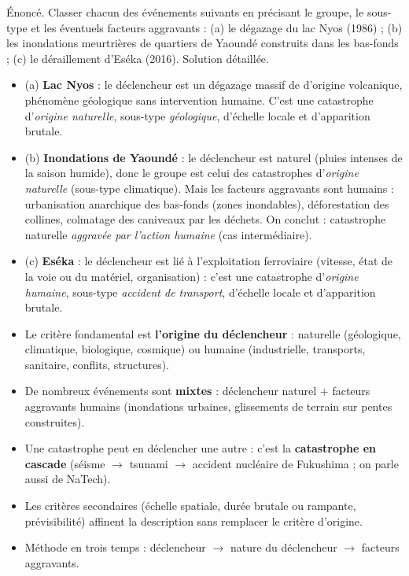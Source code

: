 \documentclass[11pt]{article}
\begin{document}
\begin{exoresolu}
Énoncé. Classer chacun des événements suivants en précisant le groupe, le sous-type et les éventuels facteurs aggravants : (a) le dégazage du lac Nyos (1986) ; (b) les inondations meurtrières de quartiers de Yaoundé construits dans les bas-fonds ; (c) le déraillement d'Eséka (2016).
\tcblower
Solution détaillée.
\begin{itemize}
\item (a) \textbf{Lac Nyos} : le déclencheur est un dégazage massif de  d'origine volcanique, phénomène géologique sans intervention humaine. C'est une catastrophe d'\emph{origine naturelle}, sous-type \emph{géologique}, d'échelle locale et d'apparition brutale.
\item (b) \textbf{Inondations de Yaoundé} : le déclencheur est naturel (pluies intenses de la saison humide), donc le groupe est celui des catastrophes d'\emph{origine naturelle} (sous-type climatique). Mais les facteurs aggravants sont humains : urbanisation anarchique des bas-fonds (zones inondables), déforestation des collines, colmatage des caniveaux par les déchets. On conclut : catastrophe naturelle \emph{aggravée par l'action humaine} (cas intermédiaire).
\item (c) \textbf{Eséka} : le déclencheur est lié à l'exploitation ferroviaire (vitesse, état de la voie ou du matériel, organisation) : c'est une catastrophe d'\emph{origine humaine}, sous-type \emph{accident de transport}, d'échelle locale et d'apparition brutale.
\end{itemize}
\end{exoresolu}

\begin{aretenir}
\begin{itemize}
\item Le critère fondamental est \textbf{l'origine du déclencheur} : naturelle (géologique, climatique, biologique, cosmique) ou humaine (industrielle, transports, sanitaire, conflits, structures).
\item De nombreux événements sont \textbf{mixtes} : déclencheur naturel + facteurs aggravants humains (inondations urbaines, glissements de terrain sur pentes construites).
\item Une catastrophe peut en déclencher une autre : c'est la \textbf{catastrophe en cascade} (séisme $\rightarrow$ tsunami $\rightarrow$ accident nucléaire de Fukushima ; on parle aussi de NaTech).
\item Les critères secondaires (échelle spatiale, durée brutale ou rampante, prévisibilité) affinent la description sans remplacer le critère d'origine.
\item Méthode en trois temps : déclencheur $\rightarrow$ nature du déclencheur $\rightarrow$ facteurs aggravants.
\end{itemize}
\end{aretenir}
\end{document}
